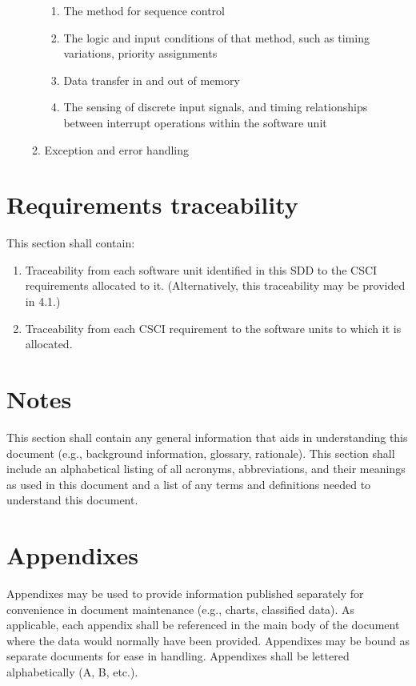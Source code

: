 \documentclass{fidata-report-template}
\begin{document}
\begin{enumerate}
\begin{enumerate}
    \begin{enumerate}
    \itemsep1pt\parskip0pt
    \item
      The method for sequence control
    \item
      The logic and input conditions of that method, such as timing
      variations, priority assignments
    \item
      Data transfer in and out of memory
    \item
      The sensing of discrete input signals, and timing relationships
      between interrupt operations within the software unit
    \end{enumerate}
  \item
    Exception and error handling
  \end{enumerate}
\end{enumerate}

\section{Requirements traceability}

This section shall contain:

\begin{enumerate}
\itemsep1pt\parskip0pt
\item
  Traceability from each software unit identified in this SDD to the
  CSCI requirements allocated to it. (Alternatively, this traceability
  may be provided in 4.1.)
\item
  Traceability from each CSCI requirement to the software units to which
  it is allocated.
\end{enumerate}

\section{Notes}

This section shall contain any general information that aids in
understanding this document (e.g., background information, glossary,
rationale). This section shall include an alphabetical listing of all
acronyms, abbreviations, and their meanings as used in this document and
a list of any terms and definitions needed to understand this document.

\appendix

\section{Appendixes}

Appendixes may be used to provide information published separately for
convenience in document maintenance (e.g., charts, classified data). As
applicable, each appendix shall be referenced in the main body of the
document where the data would normally have been provided. Appendixes
may be bound as separate documents for ease in handling. Appendixes
shall be lettered alphabetically (A, B, etc.).
\end{document}
